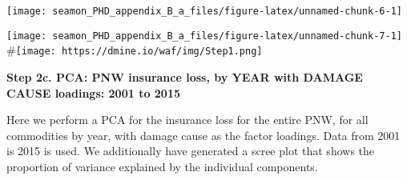 \documentclass[]{article}
\newenvironment{Shaded}{\begin{snugshade}}{\end{snugshade}}
\newcommand{\CommentTok}[1]{\textcolor[rgb]{0.56,0.35,0.01}{\textit{#1}}}
\newcommand{\DataTypeTok}[1]{\textcolor[rgb]{0.13,0.29,0.53}{#1}}
\newcommand{\DecValTok}[1]{\textcolor[rgb]{0.00,0.00,0.81}{#1}}
\newcommand{\KeywordTok}[1]{\textcolor[rgb]{0.13,0.29,0.53}{\textbf{#1}}}
\newcommand{\NormalTok}[1]{#1}
\newcommand{\OperatorTok}[1]{\textcolor[rgb]{0.81,0.36,0.00}{\textbf{#1}}}
\newcommand{\StringTok}[1]{\textcolor[rgb]{0.31,0.60,0.02}{#1}}
\begin{document}
\texttt{[image: seamon\_PHD\_appendix\_B\_a\_files/figure-latex/unnamed-chunk-6-1]}

\begin{Shaded}
\end{Shaded}

\texttt{[image: seamon\_PHD\_appendix\_B\_a\_files/figure-latex/unnamed-chunk-7-1]}
\#\texttt{[image: https://dmine.io/waf/img/Step1.png]}

\textbf{Step 2c. PCA: PNW insurance loss, by YEAR with DAMAGE CAUSE
loadings: 2001 to 2015}

Here we perform a PCA for the insurance loss for the entire PNW, for all
commodities by year, with damage cause as the factor loadings. Data from
2001 is 2015 is used. We additionally have generated a scree plot that
shows the proportion of variance explained by the individual components.
\end{document}
